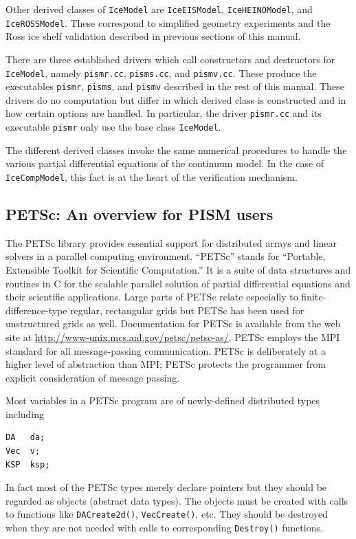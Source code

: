 \documentclass[11pt,final]{amsart}
\renewcommand{\t}[1]{\texttt{#1}}
\begin{document}
Other derived classes of \t{IceModel} are \t{IceEISModel}, \t{IceHEINOModel}, and \t{IceROSSModel}.  These correspond to simplified geometry experiments and the Ross ice shelf validation described in previous sections of this manual.

There are three established drivers which call constructors and destructors for \t{IceModel}, namely \verb|pismr.cc|, \verb|pisms.cc|, and \verb|pismv.cc|.  These produce the executables \verb|pismr|, \verb|pisms|, and \verb|pismv| described in the rest of this manual.  These drivers do no computation but differ in which derived class is constructed and in how certain options are handled.  In particular, the driver \verb|pismr.cc| and its executable \verb|pismr| only use the base class \verb|IceModel|.

The different derived classes invoke the same numerical procedures to handle the various partial differential equations of the continuum model.  In the case of \t{IceCompModel}, this fact is at the heart of the verification mechanism.

\subsection{PETSc: An overview for PISM users}  The PETSc library \cite{petsc-user-ref,petsc-efficient} provides essential support for distributed arrays and linear solvers in a parallel computing environment.  ``PETSc'' stands for ``Portable, Extensible Toolkit for Scientific Computation.''  It is a suite of data structures and routines in C for the scalable parallel solution of partial differential equations and their scientific applications.  Large parts of PETSc relate especially to finite-difference-type regular, rectangular grids but PETSc has been used for unstructured grids as well.  Documentation for PETSc is available from the web site at \url{http://www-unix.mcs.anl.gov/petsc/petsc-as/}.  PETSc employs the MPI standard for all message-passing communication.  PETSc is deliberately at a higher level of abstraction than MPI; PETSc protects the programmer from explicit consideration of message passing.

Most variables in a PETSc program are of newly-defined distributed types including
\begin{verbatim}
DA   da;
Vec  v;
KSP  ksp;
\end{verbatim}
In fact most of the PETSc types merely declare pointers but they should be regarded as objects (abstract data types).  The objects must be created with calls to functions like \t{DACreate2d()}, \t{VecCreate()}, etc.  They should be destroyed when they are not needed with calls to corresponding \t{Destroy()} functions.
\end{document}
